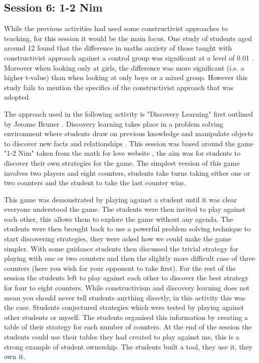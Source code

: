 \documentclass[11pt, a4paper, notitlepage]{article}
\begin{document}
\subsection{Session 6: 1-2 Nim}
While the previous activities had used some constructivist approaches to teaching, for this session it would be the main focus. One study of students aged around 12 found that the difference in maths anxiety of those taught with constructivist approach against a control group was significant at a level of 0.01 \cite{Suman:2021}. Moreover when looking only at girls, the difference was more significant (i.e. a higher t-value) than when looking at only boys or a mixed group. However this study fails to mention the specifics of the constructivist approach that was adopted. 
\par
The approach used in the following activity is "Discovery Learning" first outlined by Jerome Bruner \cite{Bruner:1961}. Discovery learning takes place in a problem solving environment where students draw on previous knowledge and manipulate objects to discover new facts and relationships \cite{learning-theories:Discovery-learning}. This session was based around the game "1-2 Nim" taken from the math for love website \cite{1-2Nim}, the aim was for students to discover their own strategies for the game. The simplest version of this game involves two players and eight counters, students take turns taking either one or two counters and the student to take the last counter wins.
\par
This game was demonstrated by playing against a student until it was clear everyone understood the game. The students were then invited to play against each other, this allows them to explore the game without any agenda. The students were then brought back to use a powerful problem solving technique to start discovering strategies, they were asked how we could make the game simpler. With some guidance students then discussed the trivial strategy for playing with one or two counters and then the slightly more difficult case of three counters (here you wish for your opponent to take first). For the rest of the session the students left to play against each other to discover the best strategy for four to eight counters. While constructivism and discovery learning does not mean you should never tell students anything directly, in this activity this was the case. Students conjectured strategies which were tested by playing against other students or myself. The students organised this information by creating a table of their strategy for each number of counters. At the end of the session the students could use their tables they had created to play against me, this is a strong example of student ownership. The students built a tool, they use it, they own it. 
\end{document}

